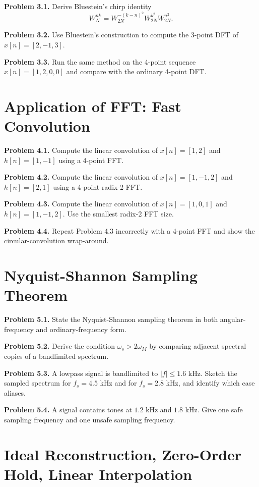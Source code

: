 \documentclass[10pt]{article}
\newcommand{\QuestionItem}[2]{\par\medskip\textbf{#1.} #2\par}
\begin{document}
\QuestionItem{Problem 3.1}{Derive Bluestein's chirp identity
  \[
    W_N^{nk}=W_{2N}^{-(k-n)^2}W_{2N}^{k^2}W_{2N}^{n^2}.
\]}

\QuestionItem{Problem 3.2}{Use Bluestein's construction to compute the 3-point DFT of \(x[n]=[2,-1,3]\).}

\QuestionItem{Problem 3.3}{Run the same method on the 4-point sequence \(x[n]=[1,2,0,0]\) and compare with the ordinary 4-point DFT.}

\section{Application of FFT: Fast Convolution}

\QuestionItem{Problem 4.1}{Compute the linear convolution of \(x[n]=[1,2]\) and \(h[n]=[1,-1]\) using a 4-point FFT.}

\QuestionItem{Problem 4.2}{Compute the linear convolution of \(x[n]=[1,-1,2]\) and \(h[n]=[2,1]\) using a 4-point radix-2 FFT.}

\QuestionItem{Problem 4.3}{Compute the linear convolution of \(x[n]=[1,0,1]\) and \(h[n]=[1,-1,2]\). Use the smallest radix-2 FFT size.}

\QuestionItem{Problem 4.4}{Repeat Problem 4.3 incorrectly with a 4-point FFT and show the circular-convolution wrap-around.}

\section{Nyquist-Shannon Sampling Theorem}

\QuestionItem{Problem 5.1}{State the Nyquist-Shannon sampling theorem in both angular-frequency and ordinary-frequency form.}

\QuestionItem{Problem 5.2}{Derive the condition \(\omega_s>2\omega_M\) by comparing adjacent spectral copies of a bandlimited spectrum.}

\QuestionItem{Problem 5.3}{A lowpass signal is bandlimited to \(|f|\le 1.6\) kHz. Sketch the sampled spectrum for \(f_s=4.5\) kHz and for \(f_s=2.8\) kHz, and identify which case aliases.}

\QuestionItem{Problem 5.4}{A signal contains tones at \(1.2\) kHz and \(1.8\) kHz. Give one safe sampling frequency and one unsafe sampling frequency.}

\section{Ideal Reconstruction, Zero-Order Hold, Linear Interpolation}
\end{document}
